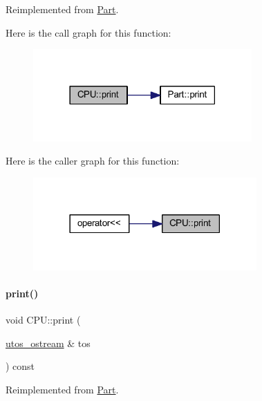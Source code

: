 Reimplemented from \mbox{\hyperlink{class_part_a4fa402b8e8fd4236ff773a7697ab2bc3}{Part}}.

Here is the call graph for this function\+:
\nopagebreak
\begin{figure}[H]
\begin{center}
\leavevmode
\includegraphics[width=237pt]{class_c_p_u_ad4d3ebb288deeaad640e034bdb71a40a_cgraph}
\end{center}
\end{figure}
Here is the caller graph for this function\+:
\nopagebreak
\begin{figure}[H]
\begin{center}
\leavevmode
\includegraphics[width=242pt]{class_c_p_u_ad4d3ebb288deeaad640e034bdb71a40a_icgraph}
\end{center}
\end{figure}
\mbox{\label{class_c_p_u_a0aea700bac0896b9e4434770737078d0}} 
\paragraph{\texorpdfstring{print()}{print()}\hspace{0.1cm}{\footnotesize\ttfamily [2/4]}}
{\footnotesize\ttfamily void C\+P\+U\+::print (\begin{DoxyParamCaption}\item[{\mbox{\hyperlink{structutos__ostream}{utos\+\_\+ostream}} \&}]{tos }\end{DoxyParamCaption}) const\hspace{0.3cm}{\ttfamily [virtual]}}



Reimplemented from \mbox{\hyperlink{class_part_a9ecabe44ba3415badf82c6a23617a41e}{Part}}.

